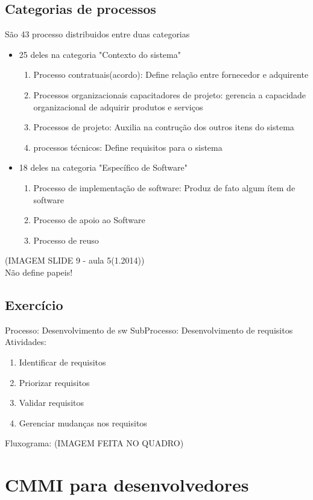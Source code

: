 \documentclass{article}
\begin{document}
\subsection{Categorias de processos}
	São 43 processo distribuidos entre duas categorias
	\begin{itemize}
	\item 25 deles na categoria "Contexto do sistema"
		\begin{enumerate}
		\item Processo contratuais(acordo): Define relação entre fornecedor e adquirente
		\item Processos organizacionais capacitadores de projeto: gerencia a capacidade organizacional de adquirir produtos e serviços
		\item Processos de projeto: Auxilia na contrução dos outros itens do sistema
		\item processos técnicos: Define requisitos para o sistema
		\end{enumerate}
	\item 18 deles na categoria "Específico de Software"
		\begin{enumerate}
		\item Processo de implementação de software: Produz de fato algum ítem de software
		\item Processo de apoio ao Software
		\item Processo de reuso
		\end{enumerate}
	\end{itemize}

	(IMAGEM SLIDE 9 - aula 5(1.2014))\\
	Não define papeis!

\subsection{Exercício}
Processo: Desenvolvimento de sw
SubProcesso: Desenvolvimento de requisitos
Atividades:
	\begin{enumerate}
	\item Identificar de requisitos
	\item Priorizar requisitos
	\item Validar requisitos
	\item Gerenciar mudanças nos requisitos	
	\end{enumerate}		
Fluxograma:
	(IMAGEM FEITA NO QUADRO)

\section{CMMI para desenvolvedores} \date{2 de Abril de 2014}
\end{document}

